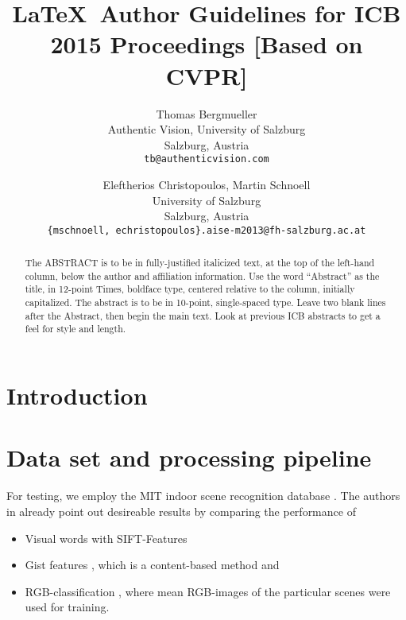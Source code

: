 \documentclass[10pt,twocolumn,letterpaper]{article}
\begin{document}
\title{\LaTeX\ Author Guidelines for ICB 2015 Proceedings [Based on CVPR]}

\author{Thomas Bergmueller\\
Authentic Vision, University of Salzburg\\
Salzburg, Austria\\
{\tt\small tb@authenticvision.com}
\and
Eleftherios Christopoulos, Martin Schnoell\\
University of Salzburg\\
Salzburg, Austria\\
{\tt\small \{mschnoell, echristopoulos\}.aise-m2013@fh-salzburg.ac.at}
}

\maketitle
\thispagestyle{empty}

\begin{abstract}
   The ABSTRACT is to be in fully-justified italicized text, at the top
   of the left-hand column, below the author and affiliation
   information. Use the word ``Abstract'' as the title, in 12-point
   Times, boldface type, centered relative to the column, initially
   capitalized. The abstract is to be in 10-point, single-spaced type.
   Leave two blank lines after the Abstract, then begin the main text.
   Look at previous ICB abstracts to get a feel for style and length.
\end{abstract}

\section{Introduction}

\section{Data set and processing pipeline}
\label{sec:data}
For testing, we employ the MIT indoor scene recognition database \cite{indoorScenes}. The authors in \cite{indoorScenes} already point out desireable results by comparing the performance of 
\begin{itemize}
	\item Visual words with SIFT-Features
	\item Gist features \cite{oliva06}, which is a content-based method and
	\item RGB-classification \cite{indoorScenes}, where mean RGB-images of the particular scenes were used for training.
\end{itemize}
\end{document}

